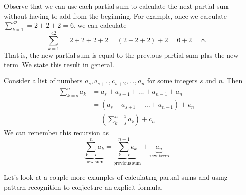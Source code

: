 Observe that we can use each partial sum to calculate the next partial sum without having to add from the beginning.  For example, once we calculate $\displaystyle \sum_{k=1}^32 = 2+2+2 = 6$, we can calculate 
    $$\displaystyle \sum_{k=1}^42 = 2+2+2+2 = (2+2+2)+2=6+2=8.$$  
That is, the new partial sum is equal to the previous partial sum plus the new term.
We state this result in general.

\begin{rem}
\label{rem_rec_def_partial_sum} 
    Consider a list of numbers $a_s, a_{s+1}, a_{s+2}, \ldots, a_n$ for some integers $s$ and $n$. Then
        \begin{align*}
            \sum_{k=s}^n a_k & = a_s + a_{s+1} + \ldots + a_{n-1} + a_n \\
            & = (a_s + a_{s+1} + \ldots + a_{n-1}) + a_n \\
            & = \left(\sum_{k=s}^{n-1} a_k\right) + a_n
        \end{align*}
    We can remember this recursion as
        $$\underbrace{\sum_{k=s}^n a_k}_{\text{new sum}} 
        = \underbrace{\sum_{k=s}^{n-1} a_k}_{\text{previous sum}} 
        + \underbrace{a_n}_{\text{new term}}$$
\end{rem}

Let's look at a couple more examples of calculating partial sums and using pattern recognition to conjecture an explicit formula.

